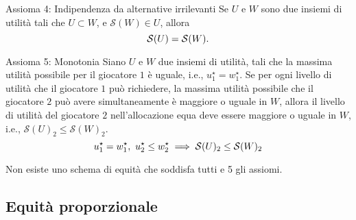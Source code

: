 \documentclass{beamer}
\begin{document}
	\begin{frame}
		\begin{exampleblock}{Assioma 4: Indipendenza da alternative irrilevanti} \label{ax4}
			Se $U$ e $W$ sono due insiemi di utilità tali che $U \subset W$, e $\mathcal{S}(W) \in U$, allora
			\vspace{-0.2cm}
			\begin{equation}
				\mathcal{S}(U) = \mathcal{S}(W).
				\vspace{-0.2cm}
			\end{equation}
		\end{exampleblock}
		\begin{exampleblock}{Assioma 5: Monotonia} \label{ax5}
			Siano $U$ e $W$ due insiemi di utilità, tali che la massima utilità possibile per il giocatore $1$ è uguale, i.e., $u_1^\star = w_1^{\star}$. Se per ogni livello di utilità che il giocatore $1$ può richiedere, la massima utilità possibile che il giocatore $2$ può avere simultaneamente è maggiore o uguale in $W$, allora il livello di utilità del giocatore $2$ nell'allocazione equa deve essere maggiore o uguale in $W$, i.e., $\mathcal{S}(U)_2 \le \mathcal{S}(W)_2$.
			\vspace{-0.3cm}
			\begin{equation}
				u_1^\star = w_1^{\star}, \ u_2^\star \le w_2^{\star} \implies \mathcal{S}(U)_2 \le \mathcal{S}(W)_2
				\vspace{-0.3cm}
			\end{equation}
			
		\end{exampleblock}
	\end{frame}
	
	\begin{frame}
		\begin{exampleblock}{}
			Non esiste uno schema di equità che soddisfa tutti e 5 gli assiomi. 
		\end{exampleblock}
	\end{frame}
	
	\subsection{Equità proporzionale}
	
\end{document}
